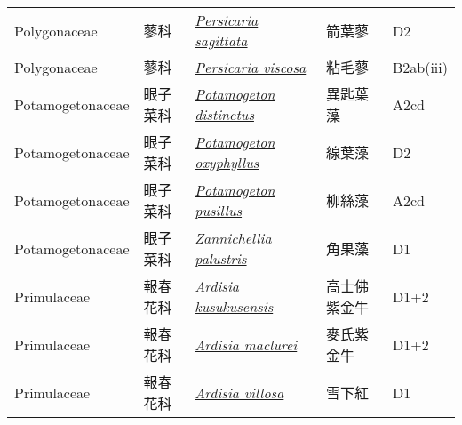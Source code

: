 {\begin{longtable}{L{2.5cm}L{2cm}L{5cm}L{2.5cm}L{3cm}}
    Polygonaceae & 蓼科 & \href{http://www.theplantlist.org/tpl1.1/search?q=Persicaria+sagittata}{\textit{Persicaria sagittata} } & 箭葉蓼 & D2    \\
    Polygonaceae & 蓼科 & \href{http://www.theplantlist.org/tpl1.1/search?q=Persicaria+viscosa}{\textit{Persicaria viscosa} } & 粘毛蓼 & B2ab(iii)    \\
    Potamogetonaceae & 眼子菜科 & \href{http://www.theplantlist.org/tpl1.1/search?q=Potamogeton+distinctus}{\textit{Potamogeton distinctus} } & 異匙葉藻 & A2cd    \\
    Potamogetonaceae & 眼子菜科 & \href{http://www.theplantlist.org/tpl1.1/search?q=Potamogeton+oxyphyllus}{\textit{Potamogeton oxyphyllus} } & 線葉藻 & D2    \\
    Potamogetonaceae & 眼子菜科 & \href{http://www.theplantlist.org/tpl1.1/search?q=Potamogeton+pusillus}{\textit{Potamogeton pusillus} } & 柳絲藻 & A2cd    \\
    Potamogetonaceae & 眼子菜科 & \href{http://www.theplantlist.org/tpl1.1/search?q=Zannichellia+palustris}{\textit{Zannichellia palustris} } & 角果藻 & D1    \\
    Primulaceae & 報春花科 & \href{http://www.theplantlist.org/tpl1.1/search?q=Ardisia+kusukusensis}{\textit{Ardisia kusukusensis} } & 高士佛紫金牛 & D1+2    \\
    Primulaceae & 報春花科 & \href{http://www.theplantlist.org/tpl1.1/search?q=Ardisia+maclurei}{\textit{Ardisia maclurei} } & 麥氏紫金牛 & D1+2    \\
    Primulaceae & 報春花科 & \href{http://www.theplantlist.org/tpl1.1/search?q=Ardisia+villosa}{\textit{Ardisia villosa} } & 雪下紅 & D1    \\

\end{longtable}}
